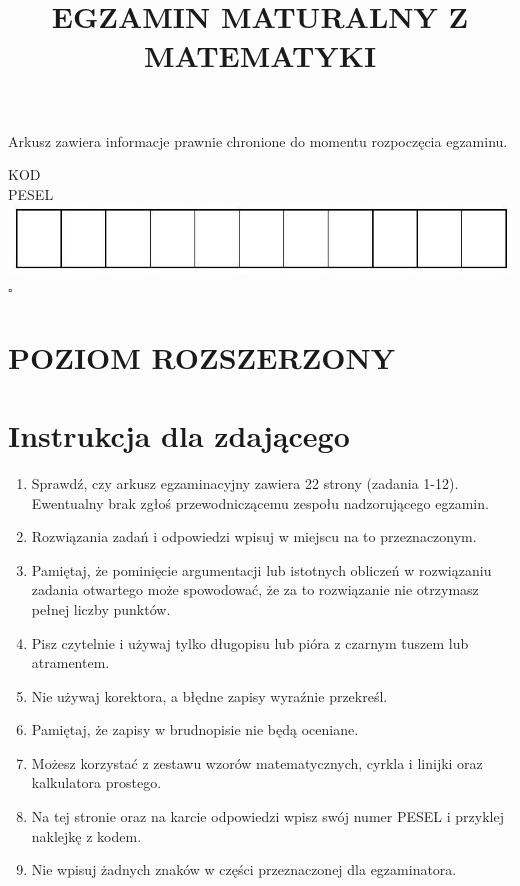 \documentclass[10pt]{article}
\title{EGZAMIN MATURALNY Z MATEMATYKI }
\author{}
\date{}
\begin{document}
\maketitle
Arkusz zawiera informacje prawnie chronione do momentu rozpoczęcia egzaminu.

KOD\\
PESEL\\
\includegraphics[max width=\textwidth, center]{2024_11_21_ebf83f11df6f4915f701g-01}\\
\(\square\)

\section*{POZIOM ROZSZERZONY}
\section*{Instrukcja dla zdającego}
\begin{enumerate}
  \item Sprawdź, czy arkusz egzaminacyjny zawiera 22 strony (zadania 1-12). Ewentualny brak zgłoś przewodniczącemu zespołu nadzorującego egzamin.
  \item Rozwiązania zadań i odpowiedzi wpisuj w miejscu na to przeznaczonym.
  \item Pamiętaj, że pominięcie argumentacji lub istotnych obliczeń w rozwiązaniu zadania otwartego może spowodować, że za to rozwiązanie nie otrzymasz pełnej liczby punktów.
  \item Pisz czytelnie i używaj tylko długopisu lub pióra z czarnym tuszem lub atramentem.
  \item Nie używaj korektora, a błędne zapisy wyraźnie przekreśl.
  \item Pamiętaj, że zapisy w brudnopisie nie będą oceniane.
  \item Możesz korzystać z zestawu wzorów matematycznych, cyrkla i linijki oraz kalkulatora prostego.
  \item Na tej stronie oraz na karcie odpowiedzi wpisz swój numer PESEL i przyklej naklejkę z kodem.
  \item Nie wpisuj żadnych znaków w części przeznaczonej dla egzaminatora.
\end{enumerate}
\end{document}

